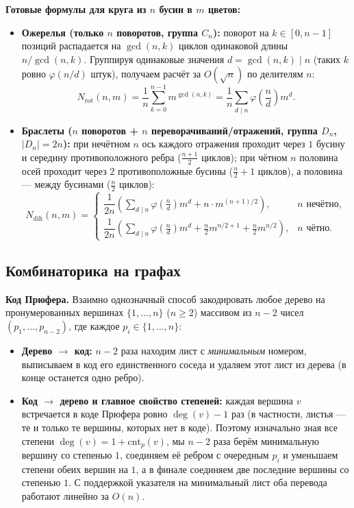 \documentclass[10pt,a4paper]{article}
\renewcommand{\ge}{\geqslant}
\begin{document}
\textbf{Готовые формулы для круга из $n$ бусин в $m$ цветов:}
\begin{itemize}
  \item \textbf{Ожерелья (только $n$ поворотов, группа $C_n$):} поворот на $k \in [0, n - 1]$ позиций распадается на $\gcd(n, k)$ циклов одинаковой длины $n / \gcd(n, k)$. Группируя одинаковые значения $d = \gcd(n, k) \mid n$ (таких $k$ ровно $\varphi(n / d)$ штук), получаем расчёт за $O(\sqrt{n})$ по делителям $n$:
  \[
    N_{\mathrm{rot}}(n, m) = \frac{1}{n} \sum_{k=0}^{n-1} m^{\gcd(n, k)} = \frac{1}{n} \sum_{d \mid n} \varphi\!\left(\frac{n}{d}\right) m^d.
  \]
  \item \textbf{Браслеты ($n$ поворотов + $n$ переворачиваний/отражений, группа $D_n$, $|D_n| = 2n$):} при нечётном $n$ ось каждого отражения проходит через $1$ бусину и середину противоположного ребра ($\frac{n + 1}{2}$ циклов); при чётном $n$ половина осей проходит через $2$ противоположные бусины ($\frac{n}{2} + 1$ циклов), а половина — между бусинами ($\frac{n}{2}$ циклов):
  \[
    N_{\mathrm{dih}}(n, m) =
    \begin{cases}
      \dfrac{1}{2n}\!\left(\displaystyle\sum_{d \mid n} \varphi\!\left(\frac{n}{d}\right) m^d + n \cdot m^{(n + 1)/2}\right), & n \text{ нечётно}, \\[10pt]
      \dfrac{1}{2n}\!\left(\displaystyle\sum_{d \mid n} \varphi\!\left(\frac{n}{d}\right) m^d + \frac{n}{2} m^{n/2 + 1} + \frac{n}{2} m^{n/2}\right), & n \text{ чётно.}
    \end{cases}
  \]
\end{itemize}

\subsection{Комбинаторика на графах}

\textbf{Код Прюфера.} Взаимно однозначный способ закодировать любое дерево на пронумерованных вершинах $\{1, \dots, n\}$ ($n \ge 2$) массивом из $n - 2$ чисел $(p_1, \dots, p_{n - 2})$, где каждое $p_i \in \{1, \dots, n\}$:
\begin{itemize}
  \item \textbf{Дерево $\to$ код:} $n - 2$ раза находим лист с \emph{минимальным} номером, выписываем в код его единственного соседа и удаляем этот лист из дерева (в конце останется одно ребро).
  \item \textbf{Код $\to$ дерево и главное свойство степеней:} каждая вершина $v$ встречается в коде Прюфера ровно $\deg(v) - 1$ раз (в частности, листья — те и только те вершины, которых нет в коде). Поэтому изначально зная все степени $\deg(v) = 1 + \mathrm{cnt}_p(v)$, мы $n - 2$ раза берём минимальную вершину со степенью $1$, соединяем её ребром с очередным $p_i$ и уменьшаем степени обеих вершин на $1$, а в финале соединяем две последние вершины со степенью $1$. С поддержкой указателя на минимальный лист оба перевода работают линейно за $O(n)$.
\end{itemize}
\end{document}
